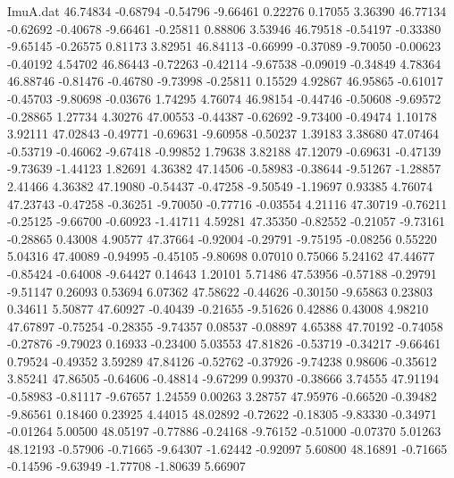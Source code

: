 \begin{filecontents}{ImuA.dat}
  46.74834   -0.68794   -0.54796   -9.66461    0.22276    0.17055    3.36390
  46.77134   -0.62692   -0.40678   -9.66461   -0.25811    0.88806    3.53946
  46.79518   -0.54197   -0.33380   -9.65145   -0.26575    0.81173    3.82951
  46.84113   -0.66999   -0.37089   -9.70050   -0.00623   -0.40192    4.54702
  46.86443   -0.72263   -0.42114   -9.67538   -0.09019   -0.34849    4.78364
  46.88746   -0.81476   -0.46780   -9.73998   -0.25811    0.15529    4.92867
  46.95865   -0.61017   -0.45703   -9.80698   -0.03676    1.74295    4.76074
  46.98154   -0.44746   -0.50608   -9.69572   -0.28865    1.27734    4.30276
  47.00553   -0.44387   -0.62692   -9.73400   -0.49474    1.10178    3.92111
  47.02843   -0.49771   -0.69631   -9.60958   -0.50237    1.39183    3.38680
  47.07464   -0.53719   -0.46062   -9.67418   -0.99852    1.79638    3.82188
  47.12079   -0.69631   -0.47139   -9.73639   -1.44123    1.82691    4.36382
  47.14506   -0.58983   -0.38644   -9.51267   -1.28857    2.41466    4.36382
  47.19080   -0.54437   -0.47258   -9.50549   -1.19697    0.93385    4.76074
  47.23743   -0.47258   -0.36251   -9.70050   -0.77716   -0.03554    4.21116
  47.30719   -0.76211   -0.25125   -9.66700   -0.60923   -1.41711    4.59281
  47.35350   -0.82552   -0.21057   -9.73161   -0.28865    0.43008    4.90577
  47.37664   -0.92004   -0.29791   -9.75195   -0.08256    0.55220    5.04316
  47.40089   -0.94995   -0.45105   -9.80698    0.07010    0.75066    5.24162
  47.44677   -0.85424   -0.64008   -9.64427    0.14643    1.20101    5.71486
  47.53956   -0.57188   -0.29791   -9.51147    0.26093    0.53694    6.07362
  47.58622   -0.44626   -0.30150   -9.65863    0.23803    0.34611    5.50877
  47.60927   -0.40439   -0.21655   -9.51626    0.42886    0.43008    4.98210
  47.67897   -0.75254   -0.28355   -9.74357    0.08537   -0.08897    4.65388
  47.70192   -0.74058   -0.27876   -9.79023    0.16933   -0.23400    5.03553
  47.81826   -0.53719   -0.34217   -9.66461    0.79524   -0.49352    3.59289
  47.84126   -0.52762   -0.37926   -9.74238    0.98606   -0.35612    3.85241
  47.86505   -0.64606   -0.48814   -9.67299    0.99370   -0.38666    3.74555
  47.91194   -0.58983   -0.81117   -9.67657    1.24559    0.00263    3.28757
  47.95976   -0.66520   -0.39482   -9.86561    0.18460    0.23925    4.44015
  48.02892   -0.72622   -0.18305   -9.83330   -0.34971   -0.01264    5.00500
  48.05197   -0.77886   -0.24168   -9.76152   -0.51000   -0.07370    5.01263
  48.12193   -0.57906   -0.71665   -9.64307   -1.62442   -0.92097    5.60800
  48.16891   -0.71665   -0.14596   -9.63949   -1.77708   -1.80639    5.66907

\end{filecontents}
